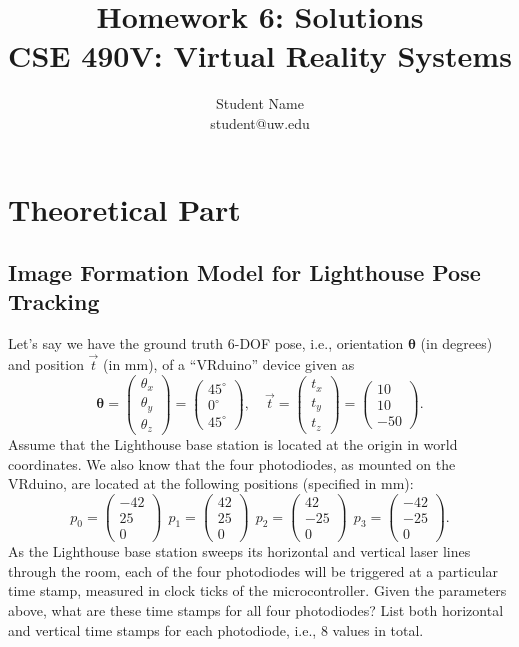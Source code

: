 \documentclass[conference]{styles/acmsiggraph}
\title{\huge Homework 6: Solutions \\ \LARGE {CSE 490V: Virtual Reality Systems}}
\author{\Large Student Name \\ student@uw.edu}
\newcommand{\points}[1]{\hfill \normalfont{(\textit{#1pts})}}
\begin{document}
\maketitle
\section{Theoretical Part}

\subsection{Image Formation Model for Lighthouse Pose Tracking \points{10}}
\label{sec:imageformation}

Let's say we have the ground truth 6-DOF pose, i.e., orientation $\boldsymbol{\theta}$ (in degrees) and position $\vec{t}$ (in mm), of a ``VRduino'' device given as
%
$$\boldsymbol{\theta} = \begin{pmatrix}
\theta_x \\ \theta_y \\ \theta_z
\end{pmatrix} = \begin{pmatrix}
45^\circ \\ 0^\circ \\ 45^\circ
\end{pmatrix}, \quad
\vec{t} = \begin{pmatrix}
t_x \\ t_y \\ t_z
\end{pmatrix} = \begin{pmatrix}
10 \\ 10 \\ -50
\end{pmatrix}.$$
%
Assume that the Lighthouse base station is located at the origin in world coordinates. We also know that the four photodiodes, as mounted on the VRduino, are located at the following positions (specified in mm):
%
$$p_0 = \begin{pmatrix}
-42 \\ 25 \\ 0
\end{pmatrix}\ \
p_1 = \begin{pmatrix}
42 \\ 25 \\ 0
\end{pmatrix}\ \
p_2 = \begin{pmatrix}
42 \\ -25 \\ 0
\end{pmatrix}\ \
p_3 = \begin{pmatrix}
-42 \\ -25 \\ 0
\end{pmatrix}.$$
%
As the Lighthouse base station sweeps its horizontal and vertical laser lines through the room, each of the four photodiodes will be triggered at a particular time stamp, measured in clock ticks of the microcontroller. Given the parameters above, what are these time stamps for all four photodiodes? List both horizontal and vertical time stamps for each photodiode, i.e., 8 values in total.
\end{document}
